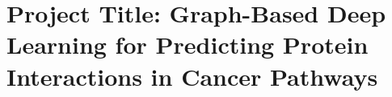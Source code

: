 \section{Project Title: Graph-Based Deep Learning for Predicting Protein Interactions in Cancer Pathways}
